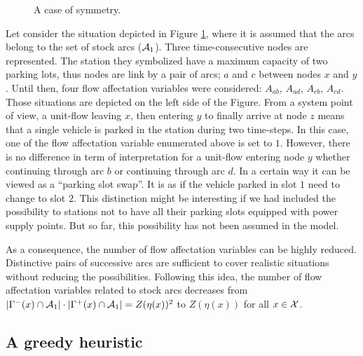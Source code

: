 \begin{bibunit}[ieeetr]
\begin{figure}[t]
\begin{center}
\scalebox{1}{}
\end{center}
\caption{A case of symmetry.}
\label{fig:symmetryExample}
\end{figure}

\medskip
Let consider the situation depicted in Figure \ref{fig:symmetryExample}, where it is assumed that the arcs belong to the set of stock arcs ($\mathcal{A}_1$).
Three time-consecutive nodes are represented.
The station they symbolized have a maximum capacity of two parking lots, thus nodes are link by a pair of arcs; \eg $a$ and $c$ between nodes $x$ and $y$.
Until then, four flow affectation variables were considered: $A_{ab}$, $A_{ad}$, $A_{cb}$, $A_{cd}$.
Those situations are depicted on the left side of the Figure.
From a system point of view, a unit-flow leaving $x$, then entering $y$ to finally arrive at node $z$ means that a single vehicle is parked in the station during two time-steps.
In this case, one of the flow affectation variable enumerated above is set to $1$.
However, there is no difference in term of interpretation for a unit-flow entering node $y$ whether continuing through arc $b$ or continuing through arc $d$.
In a certain way it can be viewed as a ``parking slot swap''.
It is as if the vehicle parked in slot $1$ need to change to slot $2$.
This distinction might be interesting if we had included the possibility to stations not to have all their parking slots equipped with power supply points.
But so far, this possibility has not been assumed in the model.

\medskip
As a consequence, the number of flow affectation variables can be highly reduced.
Distinctive pairs of successive arcs are sufficient to cover realistic situations without reducing the possibilities.
Following this idea, the number of flow affectation variables related to stock arcs decreases from $|\Gamma^-(x) \cap \mathcal{A}_1|\cdot|\Gamma^+(x) \cap \mathcal{A}_1| = Z(\eta(x))^2$ to $Z(\eta(x))$ for all $x \in \mathcal{X}$.


\subsection{A greedy heuristic}


\end{bibunit}
